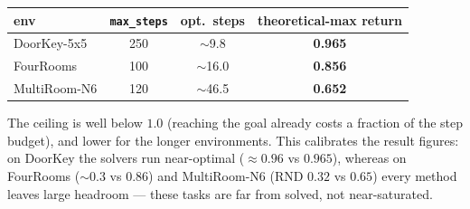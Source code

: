 \documentclass[11pt]{article}
\begin{document}
\begin{center}\begin{tabular}{lccc}
\toprule
env & \texttt{max\_steps} & opt.\ steps & \textbf{theoretical-max return}\\
\midrule
DoorKey-5x5   & 250 & $\sim$9.8  & \textbf{0.965}\\
FourRooms     & 100 & $\sim$16.0 & \textbf{0.856}\\
MultiRoom-N6  & 120 & $\sim$46.5 & \textbf{0.652}\\
\bottomrule
\end{tabular}\end{center}

\noindent The ceiling is well below $1.0$ (reaching the goal already costs a fraction of the step
budget), and lower for the longer environments. This calibrates the result figures: on DoorKey the
solvers run near-optimal ($\approx0.96$ vs $0.965$), whereas on FourRooms ($\sim$0.3 vs $0.86$) and
MultiRoom-N6 (RND $0.32$ vs $0.65$) every method leaves large headroom --- these tasks are far from
solved, not near-saturated.
\end{document}
